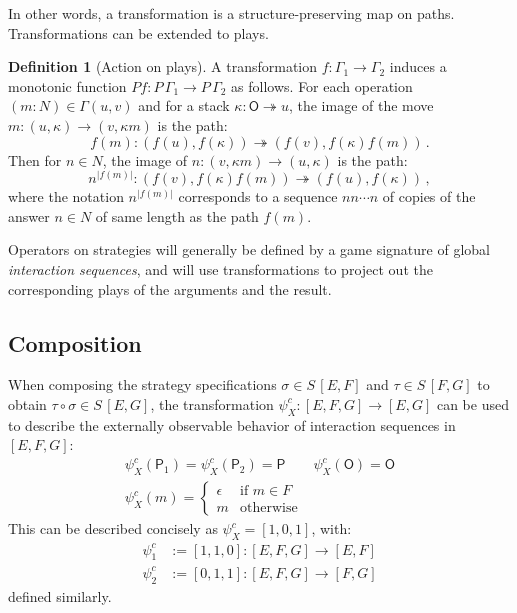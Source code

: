 \documentclass[11pt,oneside]{book}
\theoremstyle{definition}
\newtheorem{definition}[theorem]{Definition}
\newcommand{\kw}[1]{\ensuremath{ \mathsf{#1} }}
\begin{document}
In other words,
a transformation
is a structure-preserving map on paths.
Transformations can be extended to plays.

\begin{definition}[Action on plays]
A transformation
$f : \Gamma_1 \rightarrow \Gamma_2$
induces a monotonic function
$P f  : P \, \Gamma_1 \rightarrow P \, \Gamma_2$
as follows.
For each operation $(m \mathbin: N) \in \Gamma(u, v)$
and for a stack $\kappa : \kw{O} \twoheadrightarrow u$,
the image of the move
$m : (u, \kappa) \rightarrow (v, \kappa m)$
is the path:
\[
 f(m) : (f(u), f(\kappa)) \twoheadrightarrow
        (f(v), f(\kappa) f(m)) \,.
\]
Then for $n \in N$,
the image of
$n : (v, \kappa m) \rightarrow (u, \kappa)$
is the path:
\[
 n^{|f(m)|} : (f(v), f(\kappa) f(m)) \twoheadrightarrow
              (f(u), f(\kappa)) \,,
\]
where the notation $n^{|f(m)|}$
corresponds to a sequence $nn \cdots n$
of copies of the answer $n \in N$
of same length as the path $f(m)$.
\end{definition}

Operators on strategies will generally be defined
by a game signature of global \emph{interaction sequences},
and will use transformations to project out
the corresponding plays of the arguments and the result.

\subsection{Composition} %

When composing the strategy specifications
$\sigma \in S \, [E, F]$ and
$\tau \in S \, [F, G]$
to obtain $\tau \circ \sigma \in S \, [E, G]$,
the transformation
$\psi^c_X : [E,F,G] \rightarrow [E,G]$
can be used
to describe the externally observable behavior
of interaction sequences in $[E,F,G]$:
\begin{gather*}
  \psi^c_X(\kw{P}_1) = \psi^c_X(\kw{P}_2) = \kw{P} \qquad
  \psi^c_X(\kw{O}) = \kw{O}
  \\
  \psi^c_X(m) = \begin{cases}
    \epsilon & \text{if } m \in F \\
    m & \text{otherwise}
  \end{cases}
\end{gather*}
This can be described concisely as
$\psi^c_X = [1,0,1]$,
with:
\begin{align*}
  \psi^c_1 &:= [1,1,0] :
    [E,F,G] \rightarrow [E,F] \\
  \psi^c_2 &:= [0,1,1] :
     [E,F,G] \rightarrow [F,G]
\end{align*}
defined similarly.
\end{document}
